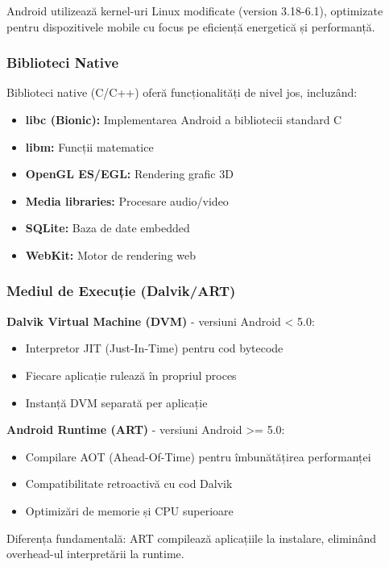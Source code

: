 \documentclass[11pt,a4paper,twocolumn]{article}
\theoremstyle{definition}
\theoremstyle{plain}
\theoremstyle{remark}
\begin{document}
Android utilizează kernel-uri Linux modificate (version 3.18-6.1), optimizate pentru 
dispozitivele mobile cu focus pe eficiență energetică și performanță.

\subsubsection{Biblioteci Native}
Biblioteci native (C/C++) oferă funcționalități de nivel jos, incluzând:
\begin{itemize}
    \item \textbf{libc (Bionic):} Implementarea Android a bibliotecii standard C
    \item \textbf{libm:} Funcții matematice
    \item \textbf{OpenGL ES/EGL:} Rendering grafic 3D
    \item \textbf{Media libraries:} Procesare audio/video
    \item \textbf{SQLite:} Baza de date embedded
    \item \textbf{WebKit:} Motor de rendering web
\end{itemize}

\subsubsection{Mediul de Execuție (Dalvik/ART)}
\textbf{Dalvik Virtual Machine (DVM)} - versiuni Android < 5.0:
\begin{itemize}
    \item Interpretor JIT (Just-In-Time) pentru cod bytecode
    \item Fiecare aplicație rulează în propriul proces
    \item Instanță DVM separată per aplicație
\end{itemize}

\textbf{Android Runtime (ART)} - versiuni Android >= 5.0:
\begin{itemize}
    \item Compilare AOT (Ahead-Of-Time) pentru îmbunătățirea performanței
    \item Compatibilitate retroactivă cu cod Dalvik
    \item Optimizări de memorie și CPU superioare
\end{itemize}

Diferența fundamentală: ART compilează aplicațiile la instalare, eliminând overhead-ul 
interpretării la runtime.
\end{document}
